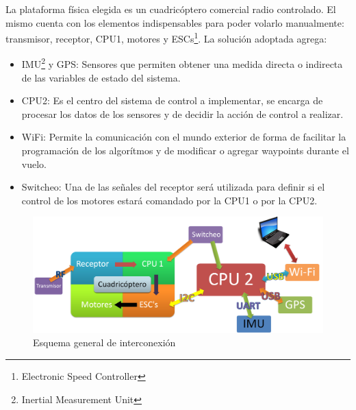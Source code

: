 \documentclass[main]{subfiles}
\begin{document}
La plataforma f\'isica elegida es un cuadric\'optero comercial radio controlado. El mismo cuenta con los elementos indispensables para poder volarlo manualmente: transmisor, receptor, CPU1, motores y ESCs\footnote{Electronic Speed Controller}. La soluci\'on adoptada agrega:
\begin{itemize}
\item IMU\footnote{Inertial Measurement Unit} y GPS: Sensores que permiten obtener una medida directa o indirecta de las variables de estado del sistema. 
\item CPU2: Es el centro del sistema de control a implementar, se encarga de procesar los datos de los sensores y de decidir la acci\'on de control a realizar. 
\item WiFi: Permite la comunicaci\'on con el mundo exterior de forma de facilitar la programaci\'on de los algor\'itmos y de modificar o agregar waypoints durante el vuelo. 
\item Switcheo: Una de las señales del receptor ser\'a utilizada para definir si el control de los motores estar\'a comandado por la CPU1 o por la CPU2. 
\end{itemize}

\begin{figure}[h!]
  \centering
  \includegraphics[width=1\textwidth]{./pics_general/diagrama_gral_2.png}
  \caption{Esquema general de interconexi\'on}
  \label{fig:esquema_gral}
\end{figure}
\end{document}
